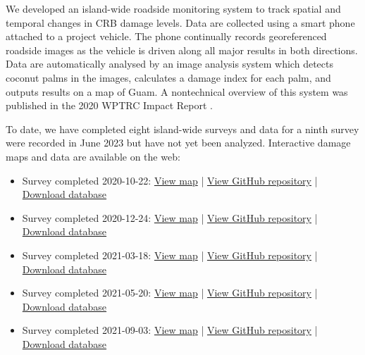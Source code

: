 \begin{refsection}
We developed an island-wide roadside monitoring system to track spatial and temporal changes in CRB damage levels. Data are collected using a smart phone attached to a project vehicle. The phone continually records georeferenced roadside images as the vehicle is driven along all major results in both directions. Data are automatically analysed by an image analysis system which detects coconut palms in the images, calculates a damage index for each palm, and outputs results on a map of Guam. A nontechnical overview of this system was published in the 2020 WPTRC Impact Report \parencite{moore_using_2020-1}.

To date, we have completed eight island-wide surveys and data for a ninth survey were recorded in June 2023 but have not yet been analyzed. Interactive damage maps and data are available on the web: 

\begin{itemize}
	
\item Survey completed 2020-10-22: 
\href{(https://aubreymoore.github.io/new-crb-damage-map}{View map} | \href{https://github.com/aubreymoore/new-crb-damage-map}{View GitHub repository} | \href{https://github.com/aubreymoore/new-crb-damage-map/raw/main/original-map/Guam01.db}{Download database}

\item Survey completed 2020-12-24:
\href{https://aubreymoore.github.io/Guam-CRB-damage-map-2020-12/webmap/v1}{View map} | 
\href{https://github.com/aubreymoore/Guam-CRB-damage-map-2020-12)}{View GitHub repository} | 
\href{https://github.com/aubreymoore/Guam-CRB-damage-map-2020-12/raw/main/Guam02.db}{Download database}

\item Survey completed 2021-03-18: 
\href{https://aubreymoore.github.io/Guam-CRB-Damage-Map-2021-03}{View map} | 
\href{https://github.com/aubreymoore/Guam-CRB-damage-map-2021-03}{View GitHub repository} | 
\href{https://github.com/aubreymoore/Guam-CRB-Damage-Map-2021-03/blob/main/Guam03.zip}{Download database}

\item Survey completed 2021-05-20: 
\href{https://aubreymoore.github.io/Guam-CRB-Damage-Map-2021-05/webmap}{View map} | 
\href{https://github.com/aubreymoore/Guam-CRB-Damage-Map-2021-05}{View GitHub repository} | 
\href{https://github.com/aubreymoore/Guam-CRB-Damage-Map-2021-05/raw/main/Guam04.db}{Download database}

\item Survey completed 2021-09-03: 
\href{https://aubreymoore.github.io/Guam-CRB-Damage-Map-20021-09/webmap}{View map} | 
\href{https://github.com/aubreymoore/Guam-CRB-Damage-Map-20021-09}{View GitHub repository} | 
\href{https://github.com/aubreymoore/Guam-CRB-Damage-Map-20021-09/raw/main/crb-damage-2021-09.db}{Download database}


\end{itemize}
\end{refsection}
